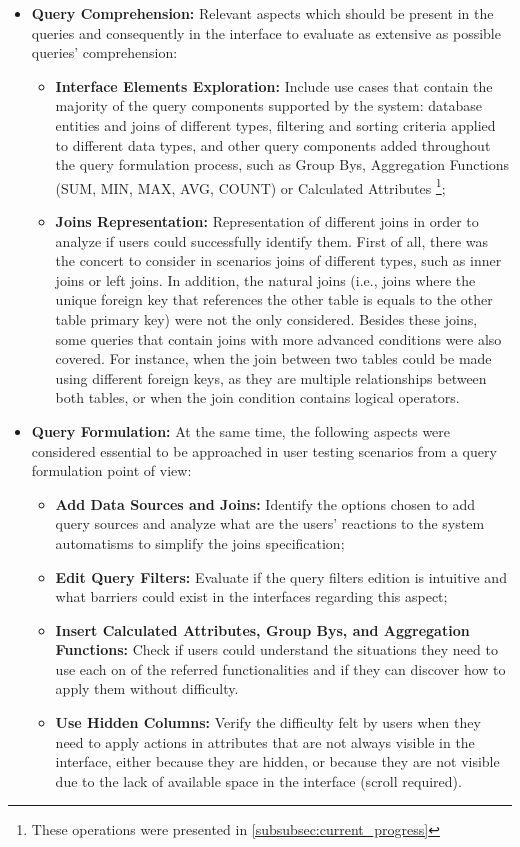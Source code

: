 \begin{itemize}
    \item \textbf{Query Comprehension: }Relevant aspects which should be present in the queries and consequently in the interface to evaluate as extensive as possible queries' comprehension:
    \begin{itemize}
        \item \textbf{Interface Elements Exploration: }Include use cases that contain the majority of the query components supported by the system: database entities and joins of different types, filtering and sorting criteria applied to different data types, and other query components added throughout the query formulation process, such as Group Bys, Aggregation Functions (SUM, MIN, MAX, AVG, COUNT) or Calculated Attributes \footnote{These operations were presented in \ref{subsubsec:current_progress}};
        \item \textbf{Joins Representation: }Representation of different joins in order to analyze if users could successfully identify them. First of all, there was the concert to consider in scenarios joins of different types, such as inner joins or left joins. In addition, the natural joins (i.e., joins where the unique foreign key that references the other table is equals to the other table primary key) were not the only considered. Besides these joins, some queries that contain joins with more advanced conditions were also covered. For instance, when the join between two tables could be made using different foreign keys, as they are multiple relationships between both tables, or when the join condition contains logical operators.
    \end{itemize}
    \item \textbf{Query Formulation: }At the same time, the following aspects were considered essential to be approached in user testing scenarios from a query formulation point of view:
    \begin{itemize}
        \item \textbf{Add Data Sources and Joins: }Identify the options chosen to add query sources and analyze what are the users' reactions to the system automatisms to simplify the joins specification;
        \item \textbf{Edit Query Filters: }Evaluate if the query filters edition is intuitive and what barriers could exist in the interfaces regarding this aspect;
        \item \textbf{Insert Calculated Attributes, Group Bys, and Aggregation Functions: }Check if users could understand the situations they need to use each on of the referred functionalities and if they can discover how to apply them without difficulty.
        \item \textbf{Use Hidden Columns: }Verify the difficulty felt by users when they need to apply actions in attributes that are not always visible in the interface, either because they are hidden, or because they are not visible due to the lack of available space in the interface (scroll required).
    \end{itemize}
\end{itemize}

